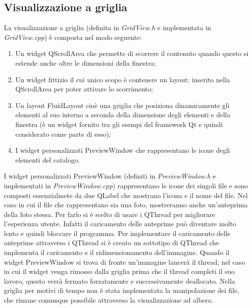 \subsection{Visualizzazione a griglia}
La visualizzazione a griglia (definita in \emph{GridView.h} e implementata in \emph{GridView.cpp}) è composta nel modo seguente:
\begin{enumerate}
    \item Un widget QScrollArea che permette di scorrere il contenuto quando questo si estende anche oltre le dimensioni della finestra;
    \item Un widget fittizio il cui unico scopo è contenere un layout; inserito nella QScrollArea per poter attivare lo scorrimento;
    \item Un layout FluidLayout cioè una griglia che posiziona dinamicamente gli elementi al suo interno a seconda della dimensione degli elementi e della finestra (è un widget fornito tra gli esempi del framework Qt e quindi considerato come parte di esso);
    \item I widget personalizzati PreviewWindow che rappresentano le icone degli elementi del catalogo.
\end{enumerate}
I widget personalizzati PreviewWindow (definiti in \emph{PreviewWindow.h} e implementati in \emph{PreviewWindow.cpp}) rappresentano le icone dei singoli file e sono composti
essenzialmete da due QLabel che mostrano l'icona e il nome del file. Nel caso in cui il file che rappresentano sia una foto, mostreranno anche un'anteprima della foto stessa.
Per farlo si è scelto di usare i QThread per migliorare l'esperienza utente. Infatti il caricamento delle anteprime può diventare molto lento e quindi bloccare il programma.
Per implementare il caricamento delle anteprime attraverso i QThread si è creato un sottotipo di QThread che implementa il caricamento e il ridimensionamento dell'immagine. 
Quando il widget PreviewWindow si trova di fronte un'immagine lancerà il thread; nel caso in cui il widget venga rimosso dalla griglia prima che il thread completi il suo lavoro, 
questo verrà fermato forzatamente e successivamente deallocato. Nella griglia per 
motivi di tempo non è stata implementata la manipolazione dei file, che rimane comunque possibile attraverso la visualizzazione ad albero.

